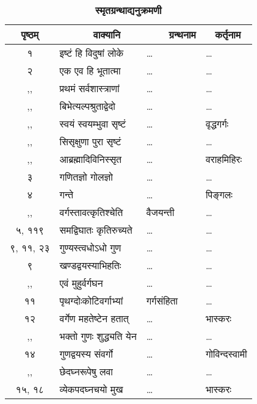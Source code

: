 \documentclass[11pt, openany]{book}
\begin{document}
\newpage 
\begin{center}
\begin{longtable}{|c|p{4.2cm}|p{3cm}|p{2.7cm}|}
		\caption{\textbf{स्मृतग्रन्थाद्यनुक्रमणी}}\\
		\hline
		{\textbf{पृष्ठम्}} &~~~~~~{\textbf{वाक्यानि}} & ~~~~{\textbf{ग्रन्थनाम}} &~ {\textbf{कर्तृनाम}} \\
		\hline
		१ & इष्टं हि विदुषां लोके\textemdash  & \ldots  & \ldots \\
		\hline
		२ & एक एव हि भूतात्मा\textemdash  & \ldots  & \dots \\
		\hline
		,, & प्रथमं सर्वशास्त्राणां\textemdash  & \ldots  & \ldots \\
		\hline
		,, & बिभेत्यल्पश्रुताद्वेदो\textemdash  & \ldots  & \ldots \\
		\hline
		,, & स्वयं स्वयम्भुवा सृष्टं\textemdash  & \ldots  & वृद्धगर्गः \\
		\hline
		,, & सिसृक्षुणा पुरा सृष्टं\textemdash  & \ldots  & \ldots \\
		\hline
		,, & आब्रह्मादिविनिस्सृत\textemdash  & \ldots  & वराहमिहिरः \\
		\hline
		३ & गणितज्ञो गोलज्ञो\textemdash  & \ldots  & \ldots \\
		\hline
		४ & गन्ते\textemdash  & \ldots\  & पिङ्गलः\\
		\hline
		,, & वर्गस्तावत्कृतिश्चेति\textemdash  & वैजयन्ती  & \ldots \\
		\hline
		५, ११९ & समद्विघातः कृतिरुच्यते\textemdash  & \ldots  & \ldots\\
		\hline
		९, ११, २३ & गुण्यस्त्वधोऽधो गुण\textemdash  & \ldots & \ldots\\
		\hline
		९ & खण्डद्वयस्याभिहतिः\textemdash  & \ldots  & \ldots \\
		\hline
		,, & एवं मुहुर्वर्गघन\textemdash  & \ldots  & \ldots \\
		\hline
		११ & पृथग्दोःकोटिवर्गाभ्यां\textemdash  & गर्गसंहिता  & \ldots \\
		\hline
		१२ & वर्गेण महतेष्टेन हतात्\textemdash  & \ldots  & भास्करः \\
		\hline
		,, & भक्तो गुणः शुद्ध्यति येन\textemdash & \ldots  & \ldots \\
		\hline
		१४ & गुणद्वयस्य संवर्गो\textemdash & \ldots  & गोविन्दस्वामी \\
		\hline
		,, & छेदघ्नरूपेषु लवा\textemdash & \ldots  & \ldots\\
		\hline
		१५, १८  & व्येकपदघ्नचयो मुख\textemdash & \ldots  & भास्करः \\

\end{longtable}
\end{center}
\end{document}
